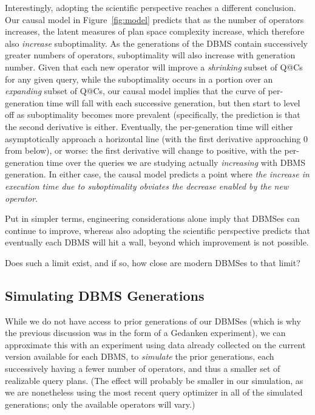 \documentclass[prodmode,acmtods]{acmsmall}
\begin{document}
Interestingly, adopting the scientific perspective reaches a different conclusion. Our
causal model in Figure~\ref{fig:model} predicts that as the number of
operators increases, the latent measures of plan space complexity increase,
which therefore also {\em increase} suboptimality. As the generations of the
\hbox{DBMS} contain successively greater numbers of operators, suboptimality
will also increase with generation number.  Given that each new operator
will improve a {\em shrinking}
subset of Q@Cs for any given query, while the suboptimality occurs in a portion over an
{\em expanding} subset of Q@Cs, our causal model implies that the curve of
per-generation time will fall with each successive generation, but then
start to level off as suboptimality becomes more prevalent (specifically,
the prediction is that the second derivative is either. Eventually, the
per-generation time will either asymptotically approach a horizontal line
(with the first derivative approaching 0 from below), or worse: the first
derivative will change to positive, with the per-generation time over the
queries we are studying actually {\em increasing} with \hbox{DBMS}
generation. In either case, the causal model predicts a point where {\em the
\hbox{increase} in execution time due to suboptimality obviates the decrease
enabled by the new operator}.

Put in simpler terms, engineering considerations alone imply that DBMSes can
continue to improve, whereas also adopting the scientific perspective predicts
that eventually each DBMS will hit a wall, beyond which improvement is not possible.

Does such a limit exist, and if so, how close are modern \hbox{DBMSes} to that limit?

\subsection{Simulating \hbox{DBMS} Generations}
While we do not have access to prior generations of our \hbox{DBMSes} (which is why
the previous discussion was in the form of a Gedanken experiment), we can
approximate this with an experiment using data already collected on the
current version available for each \hbox{DBMS}, to {\em simulate} the prior
generations, each successively having a fewer number of operators, and thus a smaller set of
realizable query plans. (The effect will probably be smaller in our
simulation, as we are nonetheless using the most recent query
optimizer in all of the simulated generations; only the available operators
will vary.)
\end{document}
